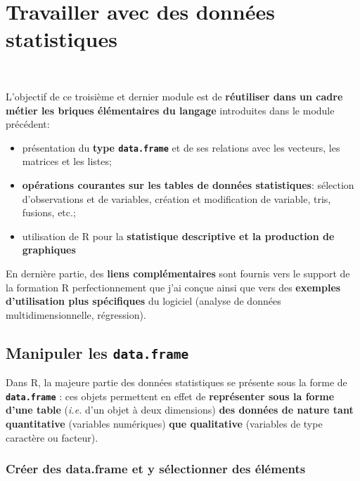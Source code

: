 \documentclass[12pt,twosided, notitlepage]{book}
\providecommand{\tightlist}{%
  \setlength{\itemsep}{0pt}\setlength{\parskip}{0pt}}
\begin{document}
\bigskip  \fi 


\chapter{Travailler avec des données statistiques}

\minitoc 

~

L'objectif de ce troisième et dernier module est de \textbf{réutiliser
dans un cadre \og métier \fg{} les briques élémentaires du langage}
introduites dans le module précédent:

\begin{itemize}
\tightlist
\item
  présentation du \textbf{type \texttt{data.frame}} et de ses relations
  avec les vecteurs, les matrices et les listes;
\item
  \textbf{opérations courantes sur les tables de données statistiques}:
  sélection d'observations et de variables, création et modification de
  variable, tris, fusions, etc.;
\item
  utilisation de R pour la \textbf{statistique descriptive et la
  production de graphiques}
\end{itemize}

En dernière partie, des \textbf{liens complémentaires} sont fournis vers
le support de la formation R perfectionnement que j'ai conçue ainsi que
vers des \textbf{exemples d'utilisation plus spécifiques} du logiciel
(analyse de données multidimensionnelle, régression).

\section{\texorpdfstring{Manipuler les
\texttt{data.frame}}{Manipuler les data.frame}}\label{manipuler-les-data.frame}

Dans R, la majeure partie des données statistiques se présente sous la
forme de \textbf{\texttt{data.frame}} : ces objets permettent en effet
de \textbf{représenter sous la forme d'une table} (\emph{i.e.} d'un
objet à deux dimensions) \textbf{des données de nature tant
quantitative} (variables numériques) \textbf{que qualitative} (variables
de type caractère ou facteur).

\subsection{Créer des data.frame et y sélectionner des
éléments}\label{creer-des-data.frame-et-y-selectionner-des-elements}
\end{document}
